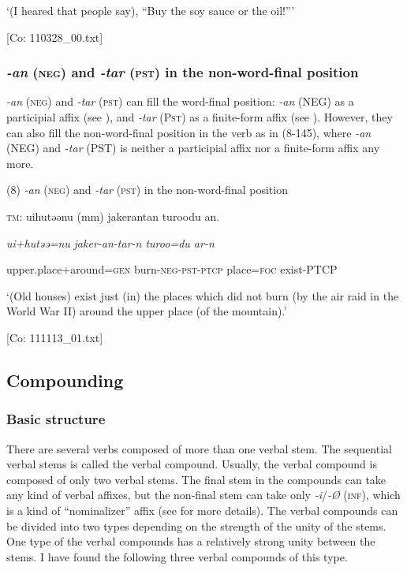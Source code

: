     ‘(I heared that people say), “Buy the soy sauce or the oil!”’

    [Co: 110328\_00.txt]

\subsubsection{\textit{{}-an} (\textsc{neg}) and \textit{{}-tar} (\textsc{pst}) in the non-word-final position}

\textit{{}-an} (\textsc{neg}) and \textit{{}-tar} (\textsc{pst}) can fill the word-final position: \textit{{}-an} (NEG) as a participial affix (see ), and \textit{{}-tar} (P\textsc{st}) as a finite-form affix (see ). However, they can also fill the non-word-final position in the verb as in (8-145), where \textit{{}-an} (NEG) and \textit{{}-tar} (PST) is neither a participial affix nor a finite-form affix any more.

(8)  \textit{{}-an} (\textsc{neg}) and \textit{-tar} (\textsc{pst}) in the non-word-final position

  \textsc{tm}:  uihutəənu  (mm)  {\textbar}jaker{\textbar}antan  turoodu  an.

    \textit{ui+hutəə=nu}    \textit{jaker-an-tar{}-n  turoo=du  ar-n}

    upper.place+around=\textsc{gen}    burn-\textsc{neg}-\textsc{pst}-\textsc{ptcp}  place=\textsc{foc}  exist-PTCP

    ‘(Old houses) exist just (in) the places which did not burn (by the air raid in the World War II) around the upper place (of the mountain).’

    [Co: 111113\_01.txt]

\subsection{Compounding}
\subsubsection{Basic structure}

There are several verbs composed of more than one verbal stem. The sequential verbal stems is called the verbal compound. Usually, the verbal compound is composed of only two verbal stems. The final stem in the compounds can take any kind of verbal affixes, but the non-final stem can take only \textit{{}-i}/\textit{{}-Ø} (\textsc{inf}), which is a kind of “nominalizer” affix (see  for more details). The verbal compounds can be divided into two types depending on the strength of the unity of the stems. One type of the verbal compounds has a relatively strong unity between the stems. I have found the following three verbal compounds of this type.

